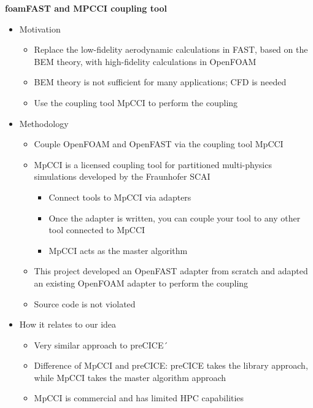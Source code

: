 \textbf{foamFAST and MPCCI coupling tool} \cite{Weber:2017}
\begin{itemize}
	\item Motivation
	\begin{itemize}
		\item Replace the low-fidelity aerodynamic calculations in FAST, based on the BEM theory, with high-fidelity calculations in OpenFOAM
		\item BEM theory is not sufficient for many applications; CFD is needed
		\item Use the coupling tool MpCCI to perform the coupling
	\end{itemize}
	\item Methodology
	\begin{itemize}
		\item Couple OpenFOAM and OpenFAST via the coupling tool MpCCI
		\item MpCCI is a licensed coupling tool for partitioned multi-physics simulations developed by the Fraunhofer SCAI
		\begin{itemize}
			\item Connect tools to MpCCI via adapters
			\item Once the adapter is written, you can couple your tool to any other tool connected to MpCCI
			\item MpCCI acts as the master algorithm
		\end{itemize}
		\item This project developed an OpenFAST adapter from scratch and adapted an existing OpenFOAM adapter to perform the coupling
		\item Source code is not violated
	\end{itemize}
	\item How it relates to our idea
	\begin{itemize}
		\item Very similar approach to preCICE´
		\item Difference of MpCCI and preCICE: preCICE takes the library approach, while MpCCI takes the master algorithm approach
		\item MpCCI is commercial and has limited HPC capabilities
		\\
	\end{itemize}
\end{itemize}


